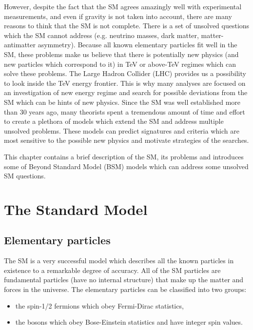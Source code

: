 However, despite the fact that the SM agrees amazingly well with experimental measurements, and even if gravity is not taken into account, 
there are many reasons to think that the SM is not complete.
There is a set of unsolved questions which the SM cannot address (e.g. neutrino masses, dark matter, matter-antimatter asymmetry).
Because all known elementary particles fit well in the SM, these problems make us believe that there is
potentially new physics (and new particles which correspond to it) in TeV or above-TeV regimes which can solve these problems.
The Large Hadron Collider (LHC) provides us a possibility to look inside the TeV energy frontier.
This is why many analyses are focused on an investigation of new energy regime and search for possible deviations from the SM which can be hints of new physics.
Since the SM was well established more than 30 years ago, many theorists spent a tremendous amount of time and effort to create
a plethora of models which extend the SM and address multiple unsolved problems. These models can predict signatures and criteria which are most sensitive to the possible new physics and motivate strategies of the searches.

This chapter contains a brief description of the SM, its problems and introduces some of Beyond Standard Model (BSM) models which can address some unsolved SM questions.

\section{The Standard Model}

\subsection{Elementary particles}


The SM is a very successful model which describes all the known particles in existence to a remarkable degree of accuracy.
All of the SM particles are fundamental particles (have no internal structure) that make up the matter and forces in the universe.
The elementary particles can be classified into two groups: 
\begin{itemize}
 \item the spin-1/2 fermions which obey Fermi-Dirac statistics,
 \item the bosons which obey Bose-Einstein statistics and have integer spin values.
\end{itemize}

